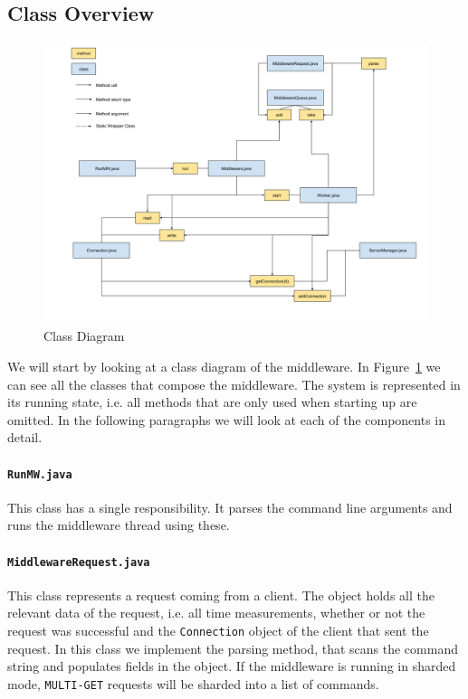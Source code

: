 \documentclass[11pt,a4paper]{article}
\begin{document}
\subsection{Class Overview}
%
\begin{figure}[H]
    \includegraphics[width=\linewidth]{../illustrations/class_diagram.png}
    \caption{Class Diagram}
    \label{fig:class_diagram}
\end{figure}
%
We will start by looking at a class diagram of the middleware.
%
In Figure~\ref{fig:class_diagram} we can see all the classes that compose the middleware.
%
The system is represented in its running state, i.e. all methods that are only used when starting up are omitted.
%
In the following paragraphs we will look at each of the components in detail.
%
\paragraph{\texttt{RunMW.java}}
%
This class has a single responsibility. It parses the command line arguments and runs the middleware thread using these.
%
\paragraph{\texttt{MiddlewareRequest.java}}
%
This class represents a request coming from a client.
%
The object holds all the relevant data of the request, i.e. all time measurements, whether or not the request was successful and the \texttt{Connection} object of the client that sent the request.
%
In this class we implement the parsing method, that scans the command string and populates fields in the object.
%
If the middleware is running in sharded mode, \texttt{MULTI-GET} requests will be sharded into a list of commands.
%
\end{document}
